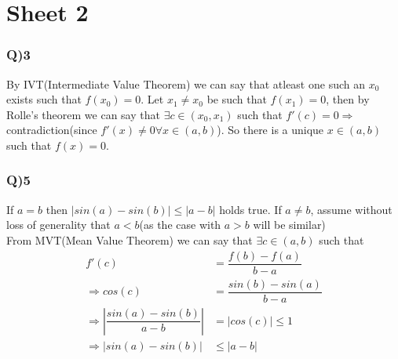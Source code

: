 \documentclass[11pt]{beamer}
\begin{document}
\section{Sheet 2}
\begin{frame}
\frametitle{Q)3}
By IVT(Intermediate Value Theorem) we can say that atleast one such an $x_0$ exists such that $f(x_0)=0$. Let $x_1\neq x_0$ be such that $f(x_1)=0$, then by Rolle's theorem we can say that $\exists c\in (x_0,x_1)$ such that $f'(c)=0\Rightarrow$ contradiction(since $f'(x)\neq 0 \forall x\in (a,b)$). So there is a unique $x\in (a,b)$ such that $f(x)=0$.
\end{frame}
\begin{frame}
\frametitle{Q)5}
If $a=b$ then $|sin(a)-sin(b)|\leq |a-b|$ holds true.
If $a\neq b$, assume without loss of generality that $a<b$(as the case with $a>b$ will be similar)\\
From MVT(Mean Value Theorem) we can say that $\exists c\in (a,b)$ such that
$$$$
\begin{align*}
f'(c)&=\dfrac{f(b)-f(a)}{b-a}\\
\Rightarrow cos(c)&=\dfrac{sin(b)-sin(a)}{b-a}\\
\Rightarrow |\dfrac{sin(a)-sin(b)}{a-b}|&=|cos(c)|\leq 1\\
\Rightarrow |sin(a)-sin(b)|&\leq |a-b|
\end{align*}
\end{frame}
\end{document}
